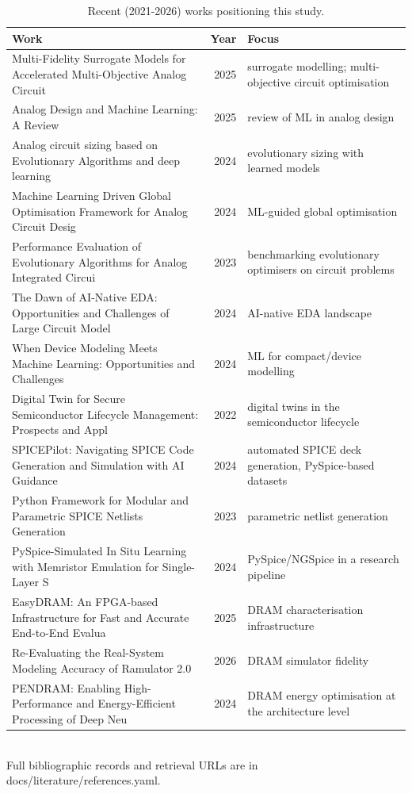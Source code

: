 \begin{table}[!t]
\centering
\caption{Recent (2021-2026) works positioning this study.}
\label{tab:literature_review}
\footnotesize
\begin{tabular}{lrl}
\toprule
Work & Year & Focus \\
\midrule
Multi-Fidelity Surrogate Models for Accelerated Multi-Objective Analog Circuit & 2025 & surrogate modelling; multi-objective circuit optimisation \\
Analog Design and Machine Learning: A Review & 2025 & review of ML in analog design \\
Analog circuit sizing based on Evolutionary Algorithms and deep learning & 2024 & evolutionary sizing with learned models \\
Machine Learning Driven Global Optimisation Framework for Analog Circuit Desig & 2024 & ML-guided global optimisation \\
Performance Evaluation of Evolutionary Algorithms for Analog Integrated Circui & 2023 & benchmarking evolutionary optimisers on circuit problems \\
The Dawn of AI-Native EDA: Opportunities and Challenges of Large Circuit Model & 2024 & AI-native EDA landscape \\
When Device Modeling Meets Machine Learning: Opportunities and Challenges & 2024 & ML for compact/device modelling \\
Digital Twin for Secure Semiconductor Lifecycle Management: Prospects and Appl & 2022 & digital twins in the semiconductor lifecycle \\
SPICEPilot: Navigating SPICE Code Generation and Simulation with AI Guidance & 2024 & automated SPICE deck generation, PySpice-based datasets \\
Python Framework for Modular and Parametric SPICE Netlists Generation & 2023 & parametric netlist generation \\
PySpice-Simulated In Situ Learning with Memristor Emulation for Single-Layer S & 2024 & PySpice/NGSpice in a research pipeline \\
EasyDRAM: An FPGA-based Infrastructure for Fast and Accurate End-to-End Evalua & 2025 & DRAM characterisation infrastructure \\
Re-Evaluating the Real-System Modeling Accuracy of Ramulator 2.0 & 2026 & DRAM simulator fidelity \\
PENDRAM: Enabling High-Performance and Energy-Efficient Processing of Deep Neu & 2024 & DRAM energy optimisation at the architecture level \\
\bottomrule
\end{tabular}
\\[2pt] \footnotesize Full bibliographic records and retrieval URLs are in docs/literature/references.yaml.
\end{table}
